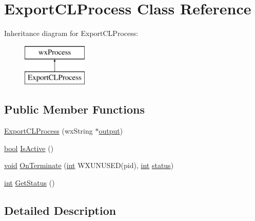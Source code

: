 \hypertarget{class_export_c_l_process}{}\section{Export\+C\+L\+Process Class Reference}
\label{class_export_c_l_process}
Inheritance diagram for Export\+C\+L\+Process\+:\begin{figure}[H]
\begin{center}
\leavevmode
\includegraphics[height=2.000000cm]{class_export_c_l_process}
\end{center}
\end{figure}
\subsection*{Public Member Functions}
\begin{DoxyCompactItemize}
\item 
\hyperlink{class_export_c_l_process_a6f9799456cd60596f1a831f87f9469a4}{Export\+C\+L\+Process} (wx\+String $\ast$\hyperlink{mm_8c_aeb3fcf4ab0f02cc4420e5a97568a07ef}{output})
\item 
\hyperlink{mac_2config_2i386_2lib-src_2libsoxr_2soxr-config_8h_abb452686968e48b67397da5f97445f5b}{bool} \hyperlink{class_export_c_l_process_a5d49693da5155fc8db25b99dcb216236}{Is\+Active} ()
\item 
\hyperlink{sound_8c_ae35f5844602719cf66324f4de2a658b3}{void} \hyperlink{class_export_c_l_process_a28c5a22ae97fdad69da377c8891d3320}{On\+Terminate} (\hyperlink{xmltok_8h_a5a0d4a5641ce434f1d23533f2b2e6653}{int} W\+X\+U\+N\+U\+S\+ED(pid), \hyperlink{xmltok_8h_a5a0d4a5641ce434f1d23533f2b2e6653}{int} \hyperlink{rfft2d_test_m_l_8m_a1b5437a866e6f95107b07ba845bc1800}{status})
\item 
\hyperlink{xmltok_8h_a5a0d4a5641ce434f1d23533f2b2e6653}{int} \hyperlink{class_export_c_l_process_a77a3e6a1246fdd538a367a2ed37f4849}{Get\+Status} ()
\end{DoxyCompactItemize}


\subsection{Detailed Description}


